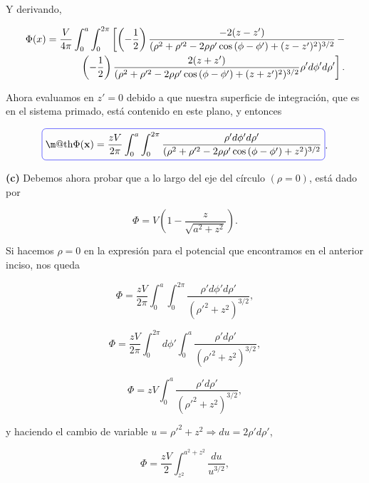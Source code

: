 \documentclass[a4paper,11pt]{article}
\makeatletter
\numberwithin{equation}{section}
\newcommand{\zerodel}{.\kern-\nulldelimiterspace}
\newcommand*{\boxcolor}{blue}
\renewcommand{\boxed}[1]{\textcolor{\boxcolor}{%
\tikz[baseline={([yshift=-1ex]current bounding box.center)}] \node [rectangle, minimum width=1ex,rounded corners,draw] {\normalcolor\m@th$\displaystyle#1$};}}
\makeatother
\begin{document}
Y derivando, 

\begin{align*}
 \Phi(x) = \frac{V}{4\pi}\int_0^a \int_0^{2\pi}\left[ \left(-\frac{1}{2}\right)
  \frac{-2(z-z')}{(\rho^2 + \rho'^2 - 2\rho\rho'\cos{(\phi - \phi')} + (z-z')^2)^{3/2}}\right\zerodel - \\
 \left\zerodel\left(-\frac{1}{2}\right)\frac{2(z+z')}{(\rho^2 + \rho'^2 - 2\rho\rho'\cos{(\phi - \phi')} + (z+z')^2)^{3/2}}
 \rho'd\phi'd\rho'\right].
\end{align*}

Ahora evaluamos en $z' = 0$ debido a que nuestra superficie de integración, que es 
en el sistema primado, está contenido en este plano, y entonces 

\begin{equation}
 \boxed{\Phi(\mathbf{x}) = \frac{zV}{2\pi}\int_0^a\int_0^{2\pi} 
 \frac{\rho' d\phi' d\rho'}{(\rho^2 + \rho'^2 - 2\rho\rho'\cos{(\phi - \phi')} + z^2)^{3/2}}}.
\end{equation}

\textbf{(c)} Debemos ahora probar que a lo largo del eje del círculo $(\rho = 0)$, 
está dado por 

\begin{equation}
 \Phi = V\left( 1 - \frac{z}{\sqrt{a^2 + z^2}}\right).
\end{equation}

Si hacemos $\rho = 0$ en la expresión para el potencial que encontramos en el 
anterior inciso, nos queda 

\begin{equation}
 \Phi = \frac{zV}{2\pi}\int_0^a\int_0^{2\pi} \frac{\rho'd\phi'd\rho'}{(\rho'^2 + 
 z^2)^{3/2}},
\end{equation}

\begin{equation}
  \Phi = \frac{zV}{2\pi}\int_0^{2\pi}d\phi'\int_0^a \frac{\rho'd\rho'}{(\rho'^2 + 
 z^2)^{3/2}},
\end{equation}

\begin{equation}
 \Phi = zV \int_0^a \frac{\rho'd\rho'}{(\rho'^2 +  z^2)^{3/2}},
\end{equation}

y haciendo el cambio de variable $u = \rho'^2 + z^2 \Rightarrow du = 2\rho'd\rho'$, 

\begin{equation}
 \Phi = \frac{zV}{2}\int_{z^2}^{a^2+z^2} \frac{du}{u^{3/2}},
\end{equation}
\end{document}
